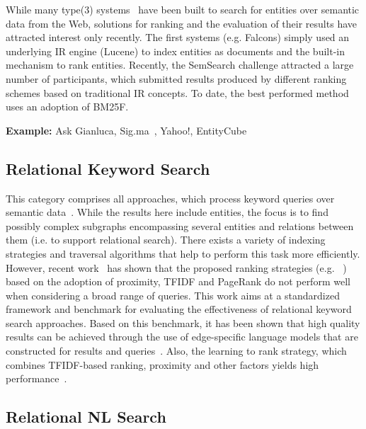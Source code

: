While many type(3) systems~\cite{DBLP:journals/ijswis/ChengQ09,DBLP:journals/ws/HoganHUKPD11,DBLP:journals/ws/TummarelloCCDDD10,DBLP:journals/ws/TranWH09} have been built to search for entities over semantic data from the Web, solutions for ranking and the evaluation of their results have attracted interest only recently. The first systems (e.g. Falcons) simply used an underlying IR engine (Lucene) to index entities as documents and the built-in mechanism to rank entities. Recently, the SemSearch challenge attracted a large number of participants, which submitted results produced by different ranking schemes based on traditional IR concepts. To date, the best performed method~\cite{DBLP:conf/semweb/BlancoMV11} uses an adoption of BM25F. 


\textbf{Example:}
Ask Gianluca, Sig.ma~\cite{DBLP:conf/sigir/Chu-CarrollPCFD06}, Yahoo!, EntityCube 


\subsection{Relational Keyword Search}
This category comprises all approaches, which process keyword queries over semantic data~\cite{DBLP:conf/icde/TranWRC09,DBLP:conf/cikm/LadwigT11,DBLP:conf/sigmod/LiOFWZ08}. While the results here include entities, the focus is to find possibly complex subgraphs encompassing several entities and relations between them (i.e. to support relational search). There exists a variety of indexing strategies and traversal algorithms that help to perform this task more efficiently. However, recent work~\cite{DBLP:conf/cikm/CoffmanW10} has shown that the proposed ranking strategies (e.g. ~\cite{DBLP:conf/icde/TranWRC09,DBLP:conf/sigmod/LiuYMC06}) based on the adoption of proximity, TFIDF and PageRank do not perform well when considering a broad range of queries. This work aims at a standardized framework and benchmark for evaluating the effectiveness of relational keyword search approaches. Based on this benchmark, it has been shown that high quality results can be achieved through the use of edge-specific language models that are constructed for results and queries~\cite{DBLP:conf/cikm/BicerTN11}. Also, the learning to rank strategy, which combines TFIDF-based ranking, proximity and other factors yields high performance~\cite{DBLP:conf/cikm/CoffmanW11}. 

\subsection{Relational NL Search} 


